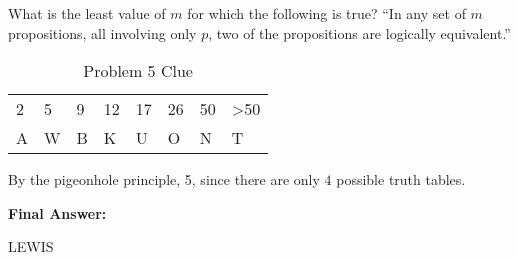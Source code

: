 \documentclass[solution, letterpaper]{cs20inclass}
\begin{document}
\problem What is the least value of $m$ for which the following is true? ``In any set of $m$ propositions, all involving only $p$, two of the propositions are logically equivalent.''

\begin{table}[h]
\centering
\begin{tabular}{llllllll}
2 & 5 & 9 & 12 & 17 & 26 & 50 & >50 \\
A & W & B & K & U & O & N & T
\end{tabular}
\caption{Problem 5 Clue}
\end{table}

\begin{solution}
By the pigeonhole principle, 5, since there are only $4$ possible truth tables.
\end{solution}

\problem \textbf{Final Answer: }

\begin{solution}
LEWIS
\end{solution}
\end{document}
